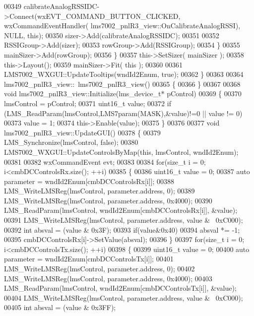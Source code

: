 \begin{DoxyCode}
{{{{00349         calibrateAnalogRSSIDC->Connect(wxEVT\_COMMAND\_BUTTON\_CLICKED, wxCommandEventHandler(
      lms7002_pnlR3_view::OnCalibrateAnalogRSSI), NULL, \textcolor{keyword}{this});
00350         sizer->Add(calibrateAnalogRSSIDC);
00351 
00352         RSSIGroup->Add(sizer);
00353         rowGroup->Add(RSSIGroup);
00354     \}
00355     mainSizer->Add(rowGroup);
00356     \}
00357     this->SetSizer( mainSizer );
00358     this->Layout();
00359     mainSizer->Fit( \textcolor{keyword}{this} );
00360 
00361     LMS7002_WXGUI::UpdateTooltips(wndId2Enum, \textcolor{keyword}{true});
00362 \}
00363 
00364 lms7002_pnlR3_view::~lms7002_pnlR3_view()
00365 \{
00366 \}
00367 
00368 \textcolor{keywordtype}{void} lms7002_pnlR3_view::Initialize(lms_device_t* pControl)
00369 \{
00370     lmsControl = pControl;
00371     uint16\_t value;
00372     \textcolor{keywordflow}{if} (LMS_ReadParam(lmsControl,LMS7param(MASK),&value)!=0  || value != 0)
00373         value = 1;
00374     this->Enable(value);
00375 \}
00376 
00377 \textcolor{keywordtype}{void} lms7002_pnlR3_view::UpdateGUI()
00378 \{
00379     LMS_Synchronize(lmsControl, \textcolor{keyword}{false});
00380     LMS7002_WXGUI::UpdateControlsByMap(\textcolor{keyword}{this}, lmsControl, wndId2Enum);
00381 
00382     wxCommandEvent evt;
00383 
00384     \textcolor{keywordflow}{for}(\textcolor{keywordtype}{size\_t} i = 0; i<cmbDCControlsRx.size(); ++i)
00385     \{
00386         uint16\_t value = 0;
00387         \textcolor{keyword}{auto} parameter = wndId2Enum[cmbDCControlsRx[i]];
00388         LMS_WriteLMSReg(lmsControl, parameter.address, 0);
00389         LMS_WriteLMSReg(lmsControl, parameter.address, 0x4000);
00390         LMS_ReadParam(lmsControl, wndId2Enum[cmbDCControlsRx[i]], &value);
00391         LMS_WriteLMSReg(lmsControl, parameter.address, value & ~0xC000);
00392         \textcolor{keywordtype}{int} absval = (value & 0x3F);
00393         \textcolor{keywordflow}{if}(value&0x40)
00394             absval *= -1;
00395         cmbDCControlsRx[i]->SetValue(absval);
00396     \}
00397     \textcolor{keywordflow}{for}(\textcolor{keywordtype}{size\_t} i = 0; i<cmbDCControlsTx.size(); ++i)
00398     \{
00399         uint16\_t value = 0;
00400         \textcolor{keyword}{auto} parameter = wndId2Enum[cmbDCControlsTx[i]];
00401         LMS_WriteLMSReg(lmsControl, parameter.address, 0);
00402         LMS_WriteLMSReg(lmsControl, parameter.address, 0x4000);
00403         LMS_ReadParam(lmsControl, wndId2Enum[cmbDCControlsTx[i]], &value);
00404         LMS_WriteLMSReg(lmsControl, parameter.address, value & ~0xC000);
00405         \textcolor{keywordtype}{int} absval = (value & 0x3FF);
}}}}
\end{DoxyCode}
